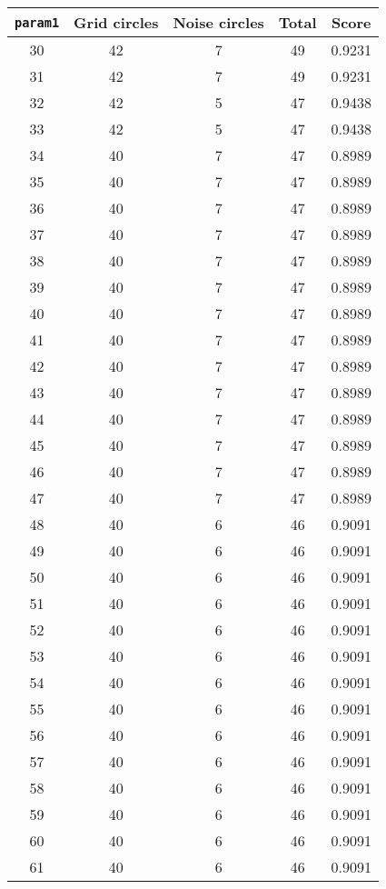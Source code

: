 \documentclass[letterpaper, 12pt]{article}
\begin{document}
\begin{longtable}{|c|c|c|c|c|}
\hline
\textbf{\texttt{param1}} & \textbf{Grid circles} & \textbf{Noise circles} & \textbf{Total} & \textbf{Score} \\
\hline
30 & 42 & 7 & 49 & 0.9231 \\
\hline
31 & 42 & 7 & 49 & 0.9231 \\
\hline
32 & 42 & 5 & 47 & 0.9438 \\
\hline
33 & 42 & 5 & 47 & 0.9438 \\
\hline
34 & 40 & 7 & 47 & 0.8989 \\
\hline
35 & 40 & 7 & 47 & 0.8989 \\
\hline
36 & 40 & 7 & 47 & 0.8989 \\
\hline
37 & 40 & 7 & 47 & 0.8989 \\
\hline
38 & 40 & 7 & 47 & 0.8989 \\
\hline
39 & 40 & 7 & 47 & 0.8989 \\
\hline
40 & 40 & 7 & 47 & 0.8989 \\
\hline
41 & 40 & 7 & 47 & 0.8989 \\
\hline
42 & 40 & 7 & 47 & 0.8989 \\
\hline
43 & 40 & 7 & 47 & 0.8989 \\
\hline
44 & 40 & 7 & 47 & 0.8989 \\
\hline
45 & 40 & 7 & 47 & 0.8989 \\
\hline
46 & 40 & 7 & 47 & 0.8989 \\
\hline
47 & 40 & 7 & 47 & 0.8989 \\
\hline
48 & 40 & 6 & 46 & 0.9091 \\
\hline
49 & 40 & 6 & 46 & 0.9091 \\
\hline
50 & 40 & 6 & 46 & 0.9091 \\
\hline
51 & 40 & 6 & 46 & 0.9091 \\
\hline
52 & 40 & 6 & 46 & 0.9091 \\
\hline
53 & 40 & 6 & 46 & 0.9091 \\
\hline
54 & 40 & 6 & 46 & 0.9091 \\
\hline
55 & 40 & 6 & 46 & 0.9091 \\
\hline
56 & 40 & 6 & 46 & 0.9091 \\
\hline
57 & 40 & 6 & 46 & 0.9091 \\
\hline
58 & 40 & 6 & 46 & 0.9091 \\
\hline
59 & 40 & 6 & 46 & 0.9091 \\
\hline
60 & 40 & 6 & 46 & 0.9091 \\
\hline
61 & 40 & 6 & 46 & 0.9091 \\

\end{longtable}
\end{document}
